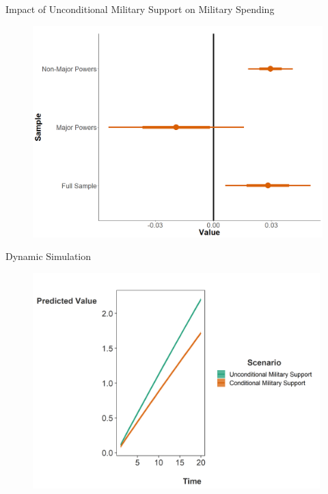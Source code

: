 \documentclass{beamer}
\begin{document}
\begin{frame}{Impact of Unconditional Military Support on Military Spending} 

\begin{figure}[htbp]
	\centering
		\includegraphics[height=0.90\textheight]{robust-reg-coef.png}
	\label{fig:robust-reg-coef}
\end{figure}

\end{frame}



\begin{frame}{Dynamic Simulation} 

\begin{figure}
	\centering
		\includegraphics[width=0.99\textwidth]{mp-dynsim.png}
	\label{fig:mp-dynsim}
\end{figure}


\end{frame}
\end{document}
